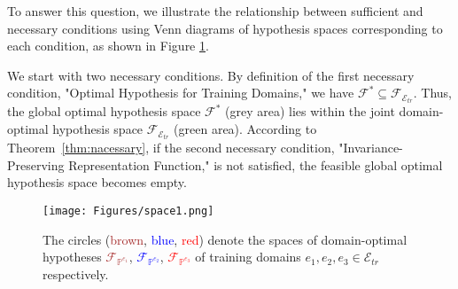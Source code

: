 To answer this question, we illustrate the relationship between sufficient and necessary conditions using Venn diagrams of hypothesis spaces corresponding to each condition, as shown in Figure \ref{fig:space}. 

We start with two necessary conditions. By definition of the first necessary condition, "Optimal Hypothesis for Training Domains," we have 
$\mathcal{F}^* \subseteq \mathcal{F}_{\mathcal{E}_{tr}}$. Thus, the global optimal hypothesis space $\mathcal{F}^*$ (grey area) lies within the joint domain-optimal hypothesis space $\mathcal{F}_{\mathcal{E}_{tr}}$ (green area). According to Theorem~\ref{thm:nacessary}, if the second necessary condition, "Invariance-Preserving Representation Function," is not satisfied, the feasible global optimal hypothesis space becomes empty.











\begin{figure}[h!]
    \centering
    \texttt{[image: Figures/space1.png]}
    \caption{The circles (\textcolor{brown}{brown}, \textcolor{blue}{blue}, \textcolor{red}{red}) denote the spaces of domain-optimal hypotheses \textcolor{brown}{$\mathcal{F}_{\mathbb{P}^{e_1}}$}, \textcolor{blue}{$\mathcal{F}_{\mathbb{P}^{e_2}}$}, \textcolor{red}{$\mathcal{F}_{\mathbb{P}^{e_3}}$} of training domains $e_1, e_2, e_3\in \mathcal{E}_{tr}$ respectively. %
    }
\label{fig:space}
\end{figure}


